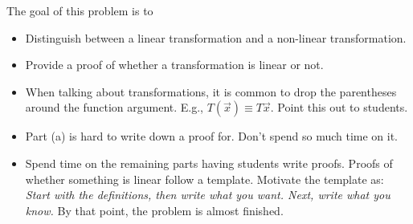 \documentclass{problemset}
\begin{document}
	\question
	\begin{annotation}
		\begin{goals}

			The goal of this problem is to
			\begin{itemize}
				\item Distinguish between a linear transformation and a non-linear transformation.
				\item Provide a proof of whether a transformation is linear or not.
			\end{itemize}
		\end{goals}

		\begin{notes}
			\begin{itemize}
				\item When talking about transformations, it is common
					to drop the parentheses around the function argument. 
					E.g., $T(\vec x)\equiv T\vec x$. Point this out to students.
				\item Part (a) is hard to write down a proof for. Don't spend so much time on it.
				\item Spend time on the remaining parts having students write proofs. Proofs 
					of whether something is linear follow a template. Motivate the template as: 
					\emph{Start with the definitions, then write what you want. Next, write what you know.}
					By that point, the problem is almost finished.
			\end{itemize}
		\end{notes}
	\end{annotation}
\end{document}
